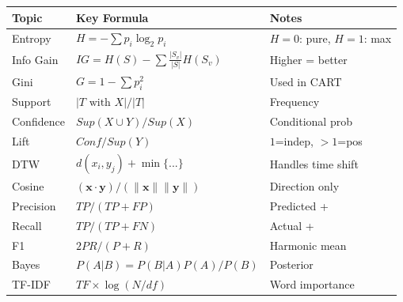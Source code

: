 \begin{center}
\begin{tabular}{lll}
\toprule
\textbf{Topic} & \textbf{Key Formula} & \textbf{Notes} \\
\midrule
Entropy & $H = -\sum p_i \log_2 p_i$ & $H=0$: pure, $H=1$: max \\
Info Gain & $IG = H(S) - \sum \frac{|S_v|}{|S|} H(S_v)$ & Higher = better \\
Gini & $G = 1 - \sum p_i^2$ & Used in CART \\
\midrule
Support & $|T \text{ with } X| / |T|$ & Frequency \\
Confidence & $Sup(X \cup Y) / Sup(X)$ & Conditional prob \\
Lift & $Conf / Sup(Y)$ & $1$=indep, $>1$=pos \\
\midrule
DTW & $d(x_i,y_j) + \min\{...\}$ & Handles time shift \\
Cosine & $(\mathbf{x} \cdot \mathbf{y}) / (\|\mathbf{x}\| \|\mathbf{y}\|)$ & Direction only \\
\midrule
Precision & $TP/(TP+FP)$ & Predicted + \\
Recall & $TP/(TP+FN)$ & Actual + \\
F1 & $2PR/(P+R)$ & Harmonic mean \\
\midrule
Bayes & $P(A|B) = P(B|A)P(A)/P(B)$ & Posterior \\
TF-IDF & $TF \times \log(N/df)$ & Word importance \\
\bottomrule
\end{tabular}
\end{center}
